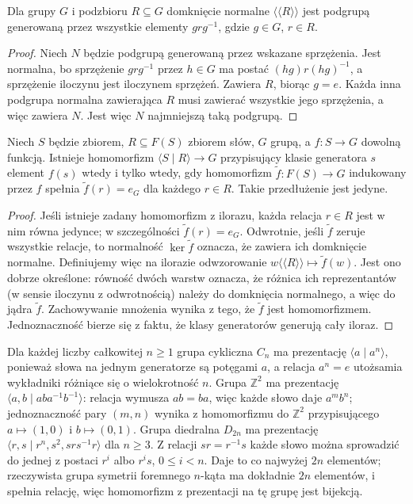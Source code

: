 \begin{lemat}
\label{aa:lem:normal-closure}
Dla grupy $G$ i podzbioru $R\subseteq G$ domknięcie normalne
$\langle\!\langle R\rangle\!\rangle$ jest podgrupą generowaną
przez wszystkie elementy $grg^{-1}$, gdzie $g\in G$, $r\in R$.
\end{lemat}
\begin{proof}
Niech $N$ będzie podgrupą generowaną przez wskazane sprzężenia.
Jest normalna, bo sprzężenie $grg^{-1}$ przez $h\in G$
ma postać $(hg)r(hg)^{-1}$, a sprzężenie iloczynu jest iloczynem
sprzężeń. Zawiera $R$, biorąc $g=e$.
Każda inna podgrupa normalna zawierająca $R$ musi zawierać
wszystkie jego sprzężenia, a więc zawiera $N$. Jest więc
$N$ najmniejszą taką podgrupą.
\end{proof}

\begin{twierdzenie}
\label{aa:tw:presentation-universal}
Niech $S$ będzie zbiorem, $R\subseteq F(S)$ zbiorem słów,
$G$ grupą, a $f:S\to G$ dowolną funkcją.
Istnieje homomorfizm $\langle S\mid R\rangle\to G$
przypisujący klasie generatora $s$ element $f(s)$ wtedy
i tylko wtedy, gdy homomorfizm $\widetilde f:F(S)\to G$
indukowany przez $f$ spełnia $\widetilde f(r)=e_G$
dla każdego $r\in R$. Takie przedłużenie jest jedyne.
\end{twierdzenie}
\begin{proof}
Jeśli istnieje zadany homomorfizm z ilorazu, każda relacja
$r\in R$ jest w nim równa jedynce; w szczególności
$\widetilde f(r)=e_G$.
Odwrotnie, jeśli $\widetilde f$ zeruje wszystkie relacje,
to normalność $\ker\widetilde f$ oznacza, że zawiera ich
domknięcie normalne. Definiujemy więc na ilorazie odwzorowanie
$w\langle\!\langle R\rangle\!\rangle\mapsto\widetilde f(w)$.
Jest ono dobrze określone: równość dwóch warstw oznacza,
że różnica ich reprezentantów (w sensie iloczynu z odwrotnością)
należy do domknięcia normalnego, a więc do jądra $\widetilde f$.
Zachowywanie mnożenia wynika z tego, że $\widetilde f$ jest
homomorfizmem.
Jednoznaczność bierze się z faktu, że klasy generatorów
generują cały iloraz.
\end{proof}

\begin{przyklad}
\label{aa:prz:presentations-basic}
Dla każdej liczby całkowitej $n\ge1$ grupa cykliczna $C_n$
ma prezentację $\langle a\mid a^n\rangle$, ponieważ słowa na jednym generatorze
są potęgami $a$, a relacja $a^n=e$ utożsamia wykładniki
różniące się o wielokrotność $n$.
Grupa $\mathbb Z^2$ ma prezentację
$\langle a,b\mid aba^{-1}b^{-1}\rangle$:
relacja wymusza $ab=ba$, więc każde słowo daje $a^m b^n$;
jednoznaczność pary $(m,n)$ wynika z homomorfizmu do
$\mathbb Z^2$ przypisującego $a\mapsto(1,0)$ i
$b\mapsto(0,1)$.
Grupa diedralna $D_{2n}$ ma prezentację
$\langle r,s\mid r^n,s^2,srs^{-1}r\rangle$ dla $n\ge3$.
Z relacji $sr=r^{-1}s$ każde słowo można sprowadzić do jednej
z postaci $r^i$ albo $r^is$, $0\le i<n$.
Daje to co najwyżej $2n$ elementów; rzeczywista grupa
symetrii foremnego $n$-kąta ma dokładnie $2n$ elementów,
i spełnia relację, więc homomorfizm z prezentacji na tę grupę
jest bijekcją.
\end{przyklad}

